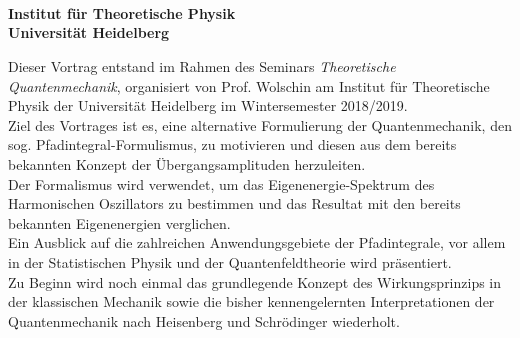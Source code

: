 \begin{center}

	\makeatletter
	\thispagestyle{plain}
	\LARGE\textbf{\@title} \\
	\vspace{2mm}
	\large\bfseries{\@author} \\
	\normalfont
	\vspace{2mm}
	\large{\@date} \\
	\vspace{2mm}
	\large{Institut für Theoretische Physik \\
		Universität Heidelberg} \\
	\makeatother
\end{center}

\normalsize

Dieser Vortrag entstand im Rahmen des Seminars \textit{Theoretische Quantenmechanik}, organisiert von Prof. Wolschin am Institut für Theoretische Physik der Universität Heidelberg im Wintersemester 2018/2019. \\
Ziel des Vortrages ist es, eine alternative Formulierung der Quantenmechanik, den sog. Pfadintegral-Formulismus, zu motivieren und diesen aus dem bereits bekannten Konzept der Übergangsamplituden herzuleiten.  \\
Der Formalismus wird verwendet, um das Eigenenergie-Spektrum des Harmonischen Oszillators zu bestimmen und das Resultat mit den bereits bekannten Eigenenergien verglichen. \\
Ein Ausblick auf die zahlreichen Anwendungsgebiete der Pfadintegrale, vor allem in der Statistischen Physik und der Quantenfeldtheorie wird präsentiert. \\
Zu Beginn wird noch einmal das grundlegende Konzept des Wirkungsprinzips in der klassischen Mechanik sowie die bisher kennengelernten Interpretationen der Quantenmechanik nach Heisenberg und Schrödinger wiederholt.